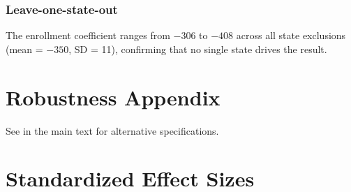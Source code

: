 \documentclass[12pt]{article}
\begin{document}
\subsubsection*{Leave-one-state-out} The enrollment coefficient ranges from $-306$ to $-408$ across all state exclusions (mean = $-350$, SD = 11), confirming that no single state drives the result.

\section{Robustness Appendix}

See  in the main text for alternative specifications.

\section{Standardized Effect Sizes}
\label{sec:sde}


\end{document}
